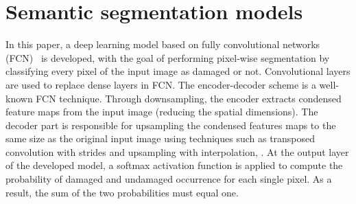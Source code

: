 \documentclass[runningheads]{llncs}
\begin{document}
\section{Semantic segmentation models}
\label{section:semantic_segmentation}
In this paper, a deep learning model based on fully convolutional networks (FCN)~\cite{shelhamer2017fully} is developed, with the goal of performing pixel-wise segmentation by classifying every pixel of the input image as damaged or not. 
Convolutional layers are used to replace dense layers in FCN.
The encoder-decoder scheme is a well-known FCN technique.
Through downsampling, the encoder extracts condensed feature maps from the input image (reducing the spatial dimensions).
The decoder part is responsible for upsampling the condensed features maps to the same size as the original input image using techniques such as transposed convolution with strides and upsampling with interpolation, .
At the output layer of the developed model, a softmax activation function is applied to compute the probability of damaged and undamaged occurrence for each single pixel.
As a result, the sum of the two probabilities must equal one.
\end{document}
